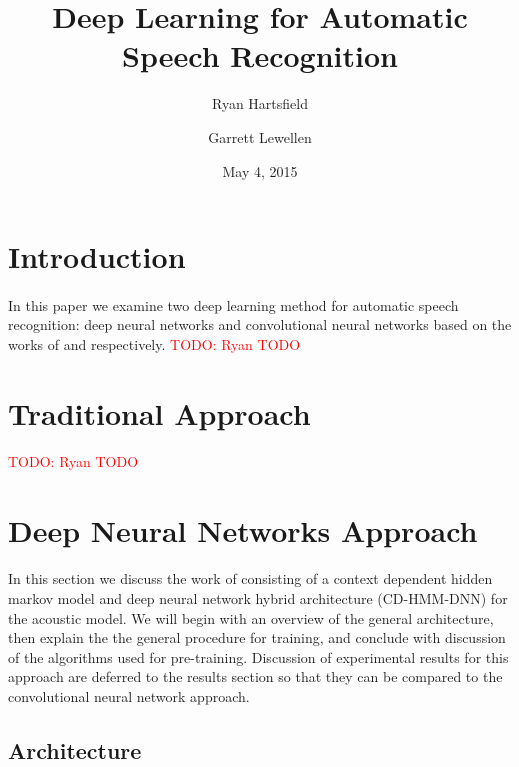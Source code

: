 \documentclass[letterpaper]{article}
\newcommand{\TODO}[1]{\textcolor{red}{TODO: #1}}
\begin{document}
\title{Deep Learning for Automatic Speech Recognition}
\author{Ryan Hartsfield \and Garrett Lewellen}
\date{May 4, 2015}

\maketitle

\doublespacing

\section*{Introduction}

\paragraph{} In this paper we examine two deep learning method for automatic speech recognition: deep neural networks and convolutional neural networks based on the works of \cite{DBLP:journals/taslp/DahlYDA12} and  \cite{DBLP:journals/taslp/Abdel-HamidMJDPY14} respectively. \TODO{Ryan TODO}

\section*{Traditional Approach} \TODO{Ryan TODO}

\section*{Deep Neural Networks Approach} 

\paragraph{} In this section we discuss the work of \cite{DBLP:journals/taslp/DahlYDA12} consisting of a context dependent hidden markov model and deep neural network hybrid architecture (CD-HMM-DNN) for the acoustic model. We will begin with an overview of the general architecture, then explain the the general procedure for training, and conclude with discussion of the algorithms used for pre-training. Discussion of experimental results for this approach are deferred to the results section so that they can be compared to the convolutional neural network approach.

\subsection*{Architecture}
\end{document}
